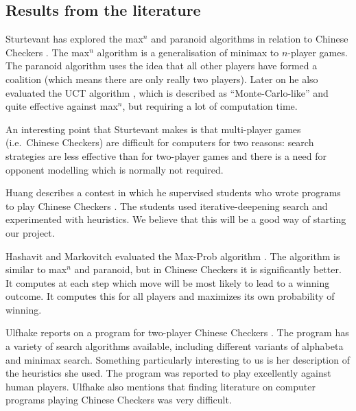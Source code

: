 \documentclass[a4paper,11pt]{article}
\begin{document}
\subsection{Results from the literature}
Sturtevant has explored the max$^n$ and paranoid algorithms in
relation to Chinese Checkers
\cite{springerlink:10.1007/978-3-540-40031-8_8}. The max$^n$ algorithm
is a generalisation of minimax to $n$-player games. The paranoid
algorithm uses the idea that all other players have formed a coalition
(which means there are only really two players). Later on he also
evaluated the UCT algorithm
\cite{springerlink:10.1007/978-3-540-87608-3_4}, which is described as
``Monte-Carlo-like'' and quite effective against max$^n$, but
requiring a lot of computation time.

An interesting point that Sturtevant makes is that multi-player games
(i.e.~Chinese Checkers) are difficult for computers for two reasons:
search strategies are less effective than for two-player games and
there is a need for opponent modelling which is normally not required.

Huang describes a contest in which he supervised students who wrote
programs to play Chinese Checkers \cite{Huang:2001:SGP:378593.378708}.
The students used iter\-ative-deep\-ening search and experimented with
heuristics. We believe that this will be a good way of starting our
project.

Hashavit and Markovitch evaluated the Max-Prob algorithm
\cite{Hashavit}. The algorithm is similar to max$^n$ and paranoid, but
in Chinese Checkers it is significantly better. It computes at each
step which move will be most likely to lead to a winning outcome. It
computes this for all players and maximizes its own probability of
winning.

Ulfhake reports on a program for two-player Chinese Checkers
\cite{ulfhake}. The program has a variety of search algorithms
available, including different variants of alphabeta and minimax
search. Something particularly interesting to us is her description of
the heuristics she used. The program was reported to play excellently
against human players. Ulfhake also mentions that finding literature
on computer programs playing Chinese Checkers was very difficult.

\end{document}
